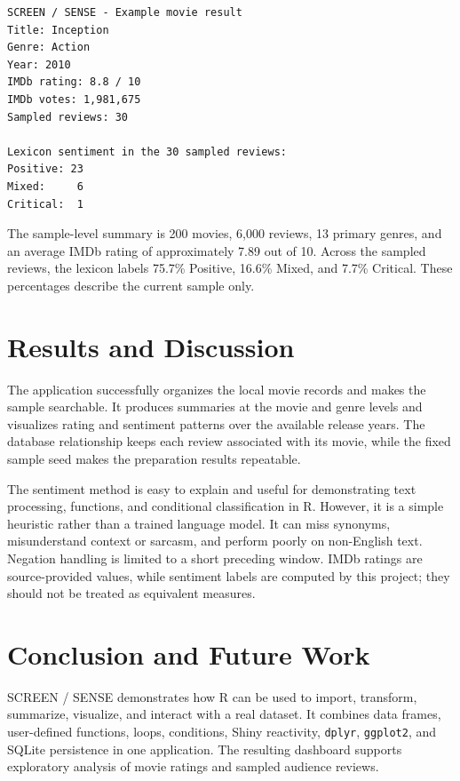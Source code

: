 \documentclass[12pt,a4paper]{report}
\begin{document}
\begin{lstlisting}
SCREEN / SENSE - Example movie result
Title: Inception
Genre: Action
Year: 2010
IMDb rating: 8.8 / 10
IMDb votes: 1,981,675
Sampled reviews: 30

Lexicon sentiment in the 30 sampled reviews:
Positive: 23
Mixed:     6
Critical:  1
\end{lstlisting}

The sample-level summary is 200 movies, 6,000 reviews, 13 primary genres, and an average IMDb rating of approximately 7.89 out of 10. Across the sampled reviews, the lexicon labels 75.7\% Positive, 16.6\% Mixed, and 7.7\% Critical. These percentages describe the current sample only.

\chapter{Results and Discussion}
The application successfully organizes the local movie records and makes the sample searchable. It produces summaries at the movie and genre levels and visualizes rating and sentiment patterns over the available release years. The database relationship keeps each review associated with its movie, while the fixed sample seed makes the preparation results repeatable.

The sentiment method is easy to explain and useful for demonstrating text processing, functions, and conditional classification in R. However, it is a simple heuristic rather than a trained language model. It can miss synonyms, misunderstand context or sarcasm, and perform poorly on non-English text. Negation handling is limited to a short preceding window. IMDb ratings are source-provided values, while sentiment labels are computed by this project; they should not be treated as equivalent measures.

\chapter{Conclusion and Future Work}
SCREEN / SENSE demonstrates how R can be used to import, transform, summarize, visualize, and interact with a real dataset. It combines data frames, user-defined functions, loops, conditions, Shiny reactivity, \texttt{dplyr}, \texttt{ggplot2}, and SQLite persistence in one application. The resulting dashboard supports exploratory analysis of movie ratings and sampled audience reviews.
\end{document}
